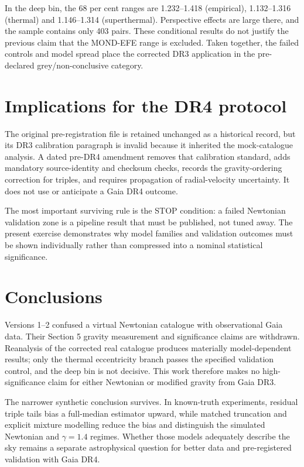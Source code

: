 In the deep bin, the 68 per cent ranges are 1.232--1.418 (empirical),
1.132--1.316 (thermal) and 1.146--1.314 (superthermal).  Perspective effects are
large there, and the sample contains only 403 pairs.  These conditional results
do not justify the previous claim that the MOND-EFE range is excluded.  Taken
together, the failed controls and model spread place the corrected DR3
application in the pre-declared grey/non-conclusive category.

\section{Implications for the DR4 protocol}
The original pre-registration file is retained unchanged as a historical
record, but its DR3 calibration paragraph is invalid because it inherited the
mock-catalogue analysis.  A dated pre-DR4 amendment removes that calibration
standard, adds mandatory source-identity and checksum checks, records
the gravity-ordering correction for triples, and requires propagation of
radial-velocity uncertainty.  It does not use or anticipate a Gaia DR4 outcome.

The most important surviving rule is the STOP condition: a failed Newtonian
validation zone is a pipeline result that must be published, not tuned away.
The present exercise demonstrates why model families and validation outcomes
must be shown individually rather than compressed into a nominal statistical
significance.

\section{Conclusions}
Versions 1--2 confused a virtual Newtonian catalogue with observational Gaia
data.  Their Section 5 gravity measurement and significance claims are
withdrawn.  Reanalysis of the corrected real catalogue produces materially
model-dependent results; only the thermal eccentricity branch passes the
specified validation control, and the deep bin is not decisive.  This work
therefore makes no high-significance claim for either Newtonian or modified
gravity from Gaia DR3.

The narrower synthetic conclusion survives.  In known-truth experiments,
residual triple tails bias a full-median estimator upward, while matched
truncation and explicit mixture modelling reduce the bias and distinguish the
simulated Newtonian and $\gamma=1.4$ regimes.  Whether those models adequately
describe the sky remains a separate astrophysical question for better data and
pre-registered validation with Gaia DR4.

